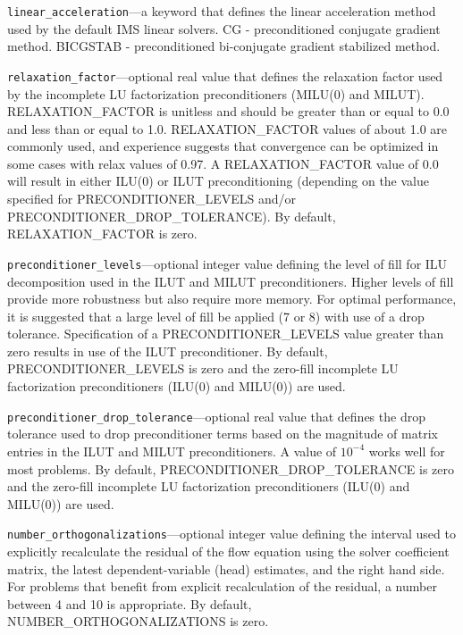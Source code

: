 \begin{description}
\item \texttt{linear\_acceleration}---a keyword that defines the linear acceleration method used by the default IMS linear solvers.  CG - preconditioned conjugate gradient method.  BICGSTAB - preconditioned bi-conjugate gradient stabilized method.

\item \texttt{relaxation\_factor}---optional real value that defines the relaxation factor used by the incomplete LU factorization preconditioners (MILU(0) and MILUT). RELAXATION\_FACTOR is unitless and should be greater than or equal to 0.0 and less than or equal to 1.0. RELAXATION\_FACTOR values of about 1.0 are commonly used, and experience suggests that convergence can be optimized in some cases with relax values of 0.97. A RELAXATION\_FACTOR value of 0.0 will result in either ILU(0) or ILUT preconditioning (depending on the value specified for PRECONDITIONER\_LEVELS and/or PRECONDITIONER\_DROP\_TOLERANCE). By default,  RELAXATION\_FACTOR is zero.

\item \texttt{preconditioner\_levels}---optional integer value defining the level of fill for ILU decomposition used in the ILUT and MILUT preconditioners. Higher levels of fill provide more robustness but also require more memory. For optimal performance, it is suggested that a large level of fill be applied (7 or 8) with use of a drop tolerance. Specification of a PRECONDITIONER\_LEVELS value greater than zero results in use of the ILUT preconditioner. By default, PRECONDITIONER\_LEVELS is zero and the zero-fill incomplete LU factorization preconditioners (ILU(0) and MILU(0)) are used.

\item \texttt{preconditioner\_drop\_tolerance}---optional real value that defines the drop tolerance used to drop preconditioner terms based on the magnitude of matrix entries in the ILUT and MILUT preconditioners. A value of $10^{-4}$ works well for most problems. By default, PRECONDITIONER\_DROP\_TOLERANCE is zero and the zero-fill incomplete LU factorization preconditioners (ILU(0) and MILU(0)) are used.

\item \texttt{number\_orthogonalizations}---optional integer value defining the interval used to explicitly recalculate the residual of the flow equation using the solver coefficient matrix, the latest dependent-variable (head) estimates, and the right hand side. For problems that benefit from explicit recalculation of the residual, a number between 4 and 10 is appropriate. By default, NUMBER\_ORTHOGONALIZATIONS is zero.


\end{description}
